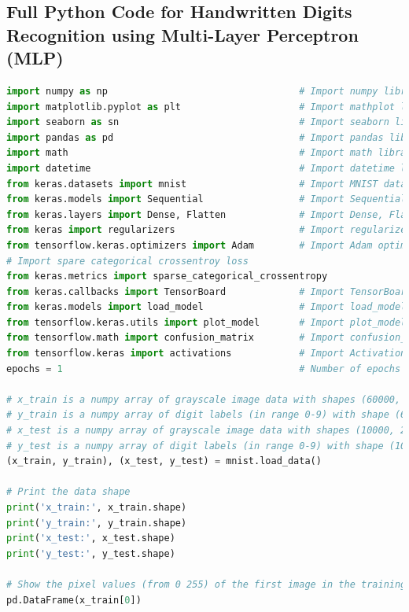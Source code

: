 \documentclass{book}
\begin{document}
\newpage
\subsection{Full Python Code for Handwritten Digits Recognition using Multi-Layer Perceptron (MLP)}
\begin{lstlisting}[language=Python, basicstyle=\ttfamily\small, keywordstyle=\color{blue}, commentstyle=\color{forestgreen}, stringstyle=\color{red}, showstringspaces=false]
import numpy as np                                  # Import numpy library
import matplotlib.pyplot as plt                     # Import mathplot library
import seaborn as sn                                # Import seaborn library
import pandas as pd                                 # Import pandas library
import math                                         # Import math library
import datetime                                     # Import datetime library
from keras.datasets import mnist                    # Import MNIST dataset
from keras.models import Sequential                 # Import Sequential class
from keras.layers import Dense, Flatten             # Import Dense, Flatten class
from keras import regularizers                      # Import regularizers
from tensorflow.keras.optimizers import Adam        # Import Adam optimizer
# Import spare categorical crossentroy loss
from keras.metrics import sparse_categorical_crossentropy
from keras.callbacks import TensorBoard             # Import TensorBoard Class
from keras.models import load_model                 # Import load_model Method
from tensorflow.keras.utils import plot_model       # Import plot_model Method
from tensorflow.math import confusion_matrix        # Import confusion_matrix Method
from tensorflow.keras import activations            # Import Activations Module
epochs = 1                                          # Number of epochs to train the model

# x_train is a numpy array of grayscale image data with shapes (60000, 28, 28)
# y_train is a numpy array of digit labels (in range 0-9) with shape (60000,)
# x_test is a numpy array of grayscale image data with shapes (10000, 28, 28)
# y_test is a numpy array of digit labels (in range 0-9) with shape (10000,)
(x_train, y_train), (x_test, y_test) = mnist.load_data()

# Print the data shape
print('x_train:', x_train.shape)
print('y_train:', y_train.shape)
print('x_test:', x_test.shape)
print('y_test:', y_test.shape)

# Show the pixel values (from 0 255) of the first image in the training set
pd.DataFrame(x_train[0])


\end{lstlisting}
\end{document}
